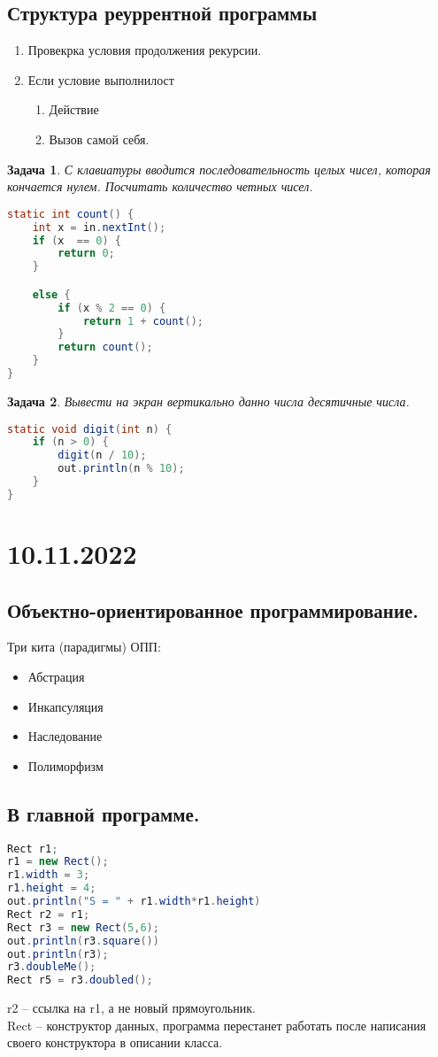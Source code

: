 \documentclass{scrartcl}
\newtheorem{task}{Задача}
\begin{document}
\subsection{Структура реуррентной программы}
\begin{enumerate}
    \item Провекрка условия продолжения рекурсии.
    \item  Если условие выполнилост
        \begin{enumerate}
            \item Действие
            \item Вызов самой себя.
        \end{enumerate}
\end{enumerate}
\begin{task}
    С клавиатуры вводится последовательность целых чисел, которая кончается нулем.
    Посчитать количество четных чисел.
\end{task}
\begin{lstlisting}[language=Java] 
static int count() {
    int x = in.nextInt();
    if (x  == 0) {
        return 0;
    }

    else {
        if (x % 2 == 0) {
            return 1 + count();
        }
        return count();
    }
}
\end{lstlisting} 
\begin{task}
    Вывести на экран вертикально данно числа десятичные числа.
\end{task}
\begin{lstlisting}[language=Java] 
static void digit(int n) {
    if (n > 0) {
        digit(n / 10);
        out.println(n % 10);
    }
}
\end{lstlisting} 
\section{10.11.2022}
\subsection{Объектно-ориентированное программирование.}
Три кита (парадигмы) ОПП:
\begin{itemize}
    \item Абстрация
    \item Инкапсуляция
    \item Наследование
    \item Полиморфизм
\end{itemize}
\subsection{В главной программе.}
\begin{lstlisting}[language=Java] 
Rect r1;
r1 = new Rect();
r1.width = 3;
r1.height = 4;
out.println("S = " + r1.width*r1.height)
Rect r2 = r1;
Rect r3 = new Rect(5,6);
out.println(r3.square())
out.println(r3);
r3.doubleMe();
Rect r5 = r3.doubled();
\end{lstlisting} 
r2 -- ссылка на r1, а не новый прямоугольник.\\
Rect -- конструктор данных, программа перестанет работать после написания своего конструктора в описании класса.
\newpage
\end{document}
